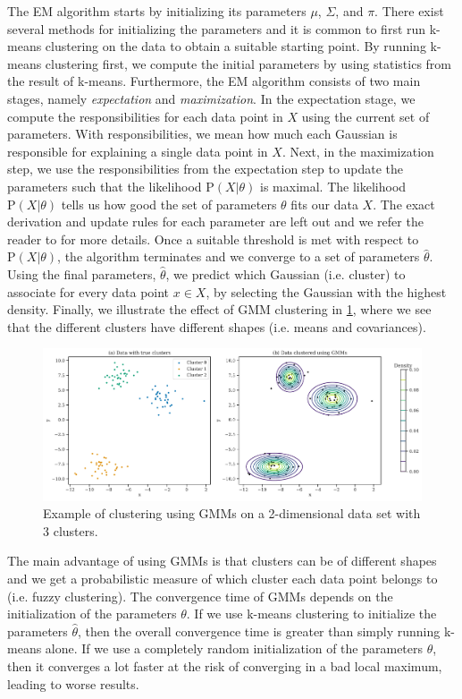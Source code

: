 The EM algorithm starts by initializing its parameters $\mu$, $\Sigma$, and $\pi$. There exist several methods for initializing the parameters and it is common to first run k-means clustering on the data to obtain a suitable starting point. By running k-means clustering first, we compute the initial parameters by using statistics from the result of k-means. Furthermore, the EM algorithm consists of two main stages, namely \textit{expectation} and \textit{maximization}. In the expectation stage, we compute the responsibilities for each data point in $X$ using the current set of parameters. With responsibilities, we mean how much each Gaussian is responsible for explaining a single data point in $X$. Next, in the maximization step, we use the responsibilities from the expectation step to update the parameters such that the likelihood $\text{P}(X | \theta)$ is maximal. The likelihood $\text{P}(X | \theta)$ tells us how good the set of parameters $\theta$ fits our data $X$. The exact derivation and update rules for each parameter are left out and we refer the reader to \cite[Section 9.4]{bishop2006} for more details. Once a suitable threshold is met with respect to $\text{P}(X | \theta)$, the algorithm terminates and we converge to a set of parameters $\hat{\theta}$. Using the final parameters, $\hat{\theta}$, we predict which Gaussian (i.e. cluster) to associate for every data point $x \in X$, by selecting the Gaussian with the highest density. Finally, we illustrate the effect of GMM clustering in \cref{fig:k-gmm-clustering-2d-example}, where we see that the different clusters have different shapes (i.e. means and covariances).
\begin{figure}[H]
    \centering
    \includegraphics[width=\textwidth]{thesis/figures/k-gmm-clustering-2d-example.pdf}
    \caption{Example of clustering using GMMs on a 2-dimensional data set with 3 clusters.}
    \label{fig:k-gmm-clustering-2d-example}
\end{figure}

The main advantage of using GMMs is that clusters can be of different shapes and we get a probabilistic measure of which cluster each data point belongs to (i.e. fuzzy clustering). The convergence time of GMMs depends on the initialization of the parameters $\theta$. If we use k-means clustering to initialize the parameters $\hat{\theta}$, then the overall convergence time is greater than simply running k-means alone. If we use a completely random initialization of the parameters $\theta$, then it converges a lot faster at the risk of converging in a bad local maximum, leading to worse results.

